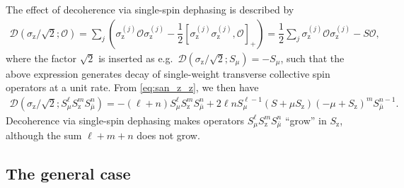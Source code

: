 \documentclass[aps,notitlepage,nofootinbib,11pt]{revtex4-1}
\newcommand{\f}[2]{\dfrac{#1}{#2}} %
\newcommand{\p}[1]{\left(#1\right)} %
\renewcommand{\sp}[1]{\left[#1\right]} %
\newcommand{\D}{\mathcal{D}}
\renewcommand{\O}{\mathcal{O}}
\newcommand{\z}{\text{z}}
\newcommand{\bmu}{{\bar\mu}}
\newcommand{\1}{\mathds{1}}
\begin{document}
The effect of decoherence via single-spin dephasing is described by
\begin{align}
  \D\p{\sigma_\z/\sqrt2; \O}
  = \sum_j\p{\sigma_\z^{(j)} \O \sigma_\z^{(j)}
    - \f12\sp{\sigma_\z^{(j)} \sigma_\z^{(j)},\O}_+}
  = \f12 \sum_j \sigma_\z^{(j)} \O \sigma_\z^{(j)} - S \O,
\end{align}
where the factor $\sqrt2$ is inserted as
e.g.~$\D\p{\sigma_\z/\sqrt2;S_\mu}=-S_\mu$, such that the above
expression generates decay of single-weight transverse collective spin
operators at a unit rate.  From \eqref{eq:san_z_z}, we then have
\begin{align}
  \D\p{\sigma_\z/\sqrt2; S_\mu^\ell S_\z^m S_\bmu^n}
  = -\p{\ell+n} S_\mu^\ell S_\z^m S_\bmu^n
  + 2 \ell n S_\mu^{\ell-1} \p{S + \mu S_\z}
  \p{-\mu + S_\z}^m S_\bmu^{n-1}.
\end{align}
Decoherence via single-spin dephasing makes operators
$S_\mu^\ell S_\z^m S_\bmu^n$ ``grow'' in $S_\z$, although the sum
$\ell+m+n$ does not grow.


\subsection{The general case}
\label{sec:general_single}
\end{document}
